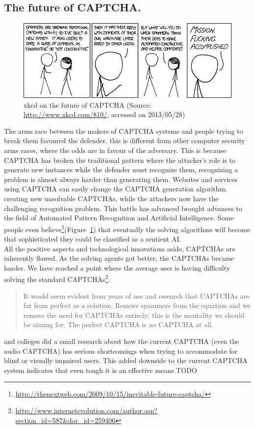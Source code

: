 \documentclass[pdftex,a4paper,12pt,twoside]{report}
\begin{document}
\subsection{The future of CAPTCHA.}
\begin{figure}
	\centering
	\includegraphics[width=13.75cm]{./img/xkcd-captcha-evolution.png}
	\caption{xkcd on the future of CAPTCHA (Source: \url{http://www.xkcd.com/810/}, accessed on 2013/05/28)}
	\label{fig:xkcdCAPTCHA}
\end{figure}
The arms race between the makers of CAPTCHA systems and people trying to break them favoured the defender. this is different from other computer security arms races, where the odds are in favour of the adversary. This is because CAPTCHA has broken the traditional pattern where the attacker's role is to generate new instances while the defender must recognize them, recognizing a problem is almost always harder than generating them. Websites and services using CAPTCHA can easily change the CAPTCHA generation algorithm, creating new unsolvable CAPTCHAs, while the attackers now have the challenging recognition problem. This battle has advanced brought advances to the field of Automated Pattern Recognition and Artificial Intelligence. Some people even believe\footnote{\url{http://thenextweb.com/2009/10/15/inevitable-future-captcha/}}(Figure~\ref{fig:xkcdCAPTCHA}) that eventually the solving algorithms will become that sophisticated they could be classified as a sentient AI.\\
All the positive aspects and technological innovations aside, CAPTCHAs are inherently flawed. As the solving agents got better, the CAPTCHAs became harder. We have reached a point where the average user is having difficulty solving the standard CAPTCHAs\footnote{\url{http://www.internetevolution.com/author.asp?section_id=587&doc_id=259406}}. 
\begin{quote}
It would seem evident from years of use and research that CAPTCHAs are far from perfect as a solution. Remove spammers from the equation and we remove the need for CAPTCHAs entirely; this is the mentality we should be aiming for. The perfect CAPTCHA is no CAPTCHA at all.\citep{Bushell2011}
\end{quote}
\citep{Sauer2008} and colleges did a small research about how the current CAPTCHA (even the audio CAPTCHA) has serious shortcomings when trying to accommodate for blind or visually impaired users. This added downside to the current CAPTCHA system indicates that even tough it is an effective means
TODO
\end{document}
